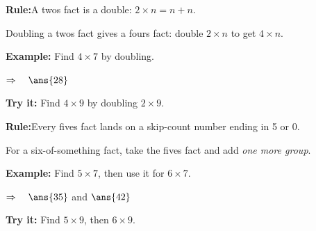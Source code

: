 \documentclass[12pt]{article}
\begin{document}


\begin{formulabox}
\textbf{Rule:}\quad A twos fact is a double: $2 \times n = n + n$.\par
Doubling a twos fact gives a fours fact: double $2 \times n$ to get $4 \times n$.
\end{formulabox}

\begin{examplebox}
\textbf{Example:} Find $4 \times 7$ by doubling.

$\Rightarrow\quad\ans{28}$
\end{examplebox}

\begin{tryitbox}
\textbf{Try it:} Find $4 \times 9$ by doubling $2 \times 9$.\\[2pt]
\end{tryitbox}


\begin{formulabox}
\textbf{Rule:}\quad Every fives fact lands on a skip-count number ending in 5 or 0.\par
For a six-of-something fact, take the fives fact and add \emph{one more group}.
\end{formulabox}

\begin{examplebox}
\textbf{Example:} Find $5 \times 7$, then use it for $6 \times 7$.

$\Rightarrow\quad\ans{35}$ and $\ans{42}$
\end{examplebox}

\begin{tryitbox}
\textbf{Try it:} Find $5 \times 9$, then $6 \times 9$.\\[2pt]
\end{tryitbox}

\end{document}

